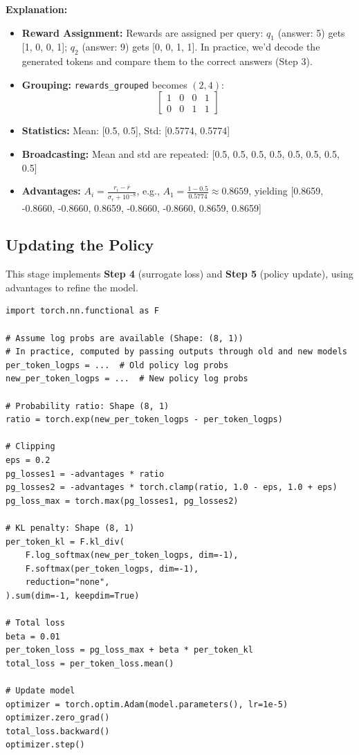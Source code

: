 \documentclass{article}
\begin{document}
\textbf{Explanation:}
\begin{itemize}
  \item \textbf{Reward Assignment:} Rewards are assigned per query: \( q_1 \) (answer: 5) gets [1, 0, 0, 1]; \( q_2 \) (answer: 9) gets [0, 0, 1, 1]. In practice, we’d decode the generated tokens and compare them to the correct answers (Step 3).
  \item \textbf{Grouping:} \texttt{rewards\_grouped} becomes \( (2, 4) \):
  \[
  \begin{bmatrix} 1 & 0 & 0 & 1 \\ 0 & 0 & 1 & 1 \end{bmatrix}
  \]
  \item \textbf{Statistics:} Mean: [0.5, 0.5], Std: [0.5774, 0.5774]
  \item \textbf{Broadcasting:} Mean and std are repeated: [0.5, 0.5, 0.5, 0.5, 0.5, 0.5, 0.5, 0.5]
  \item \textbf{Advantages:} \( A_i = \frac{r_i - \bar{r}}{\sigma_r + 10^{-8}} \), e.g., \( A_1 = \frac{1 - 0.5}{0.5774} \approx 0.8659 \), yielding [0.8659, -0.8660, -0.8660, 0.8659, -0.8660, -0.8660, 0.8659, 0.8659]
\end{itemize}

\subsection*{Updating the Policy}

This stage implements \textbf{Step 4} (surrogate loss) and \textbf{Step 5} (policy update), using advantages to refine the model.

\begin{verbatim}
import torch.nn.functional as F

# Assume log probs are available (Shape: (8, 1))
# In practice, computed by passing outputs through old and new models
per_token_logps = ...  # Old policy log probs
new_per_token_logps = ...  # New policy log probs

# Probability ratio: Shape (8, 1)
ratio = torch.exp(new_per_token_logps - per_token_logps)

# Clipping
eps = 0.2
pg_losses1 = -advantages * ratio
pg_losses2 = -advantages * torch.clamp(ratio, 1.0 - eps, 1.0 + eps)
pg_loss_max = torch.max(pg_losses1, pg_losses2)

# KL penalty: Shape (8, 1)
per_token_kl = F.kl_div(
    F.log_softmax(new_per_token_logps, dim=-1),
    F.softmax(per_token_logps, dim=-1),
    reduction="none",
).sum(dim=-1, keepdim=True)

# Total loss
beta = 0.01
per_token_loss = pg_loss_max + beta * per_token_kl
total_loss = per_token_loss.mean()

# Update model
optimizer = torch.optim.Adam(model.parameters(), lr=1e-5)
optimizer.zero_grad()
total_loss.backward()
optimizer.step()
\end{verbatim}
\end{document}
